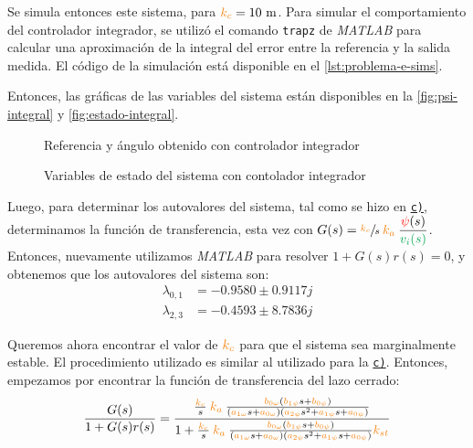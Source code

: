 Se simula entonces este sistema, para $\nara{k_{c}} = 10\ \unit{m}$. Para simular
el comportamiento del controlador integrador, se utilizó el comando \verb|trapz|
de \textit{MATLAB} para calcular una aproximación de la integral del error entre
la referencia y la salida medida. El código de la simulación está disponible en
el \autoref{lst:problema-e-sims}.

Entonces, las gráficas de las variables del sistema están disponibles en la
\autoref{fig:psi-integral} y \autoref{fig:estado-integral}.

\begin{figure}[h]
  \centering
  
  \caption{Referencia y ángulo obtenido con controlador integrador}\label{fig:psi-integral}
\end{figure}

\begin{figure}[h]
  \centering
  
  \caption{Variables de estado del sistema con contolador integrador}\label{fig:estado-integral}
\end{figure}

\FloatBarrier

Luego, para determinar los autovalores del sistema, tal como se hizo en 
\hyperref[pregunta-c]{\texttt{c)}}, determinamos la función de transferencia,
esta vez con $G(s) = \sfrac{\nara{k_{c}}}{s} \nara{k_{a}} \dfrac{\rojo{\psi}(s)}{\verd{v_{i}(s)}}$.
Entonces, nuevamente utilizamos \textit{MATLAB} para resolver $1 + G(s)r(s) = 0$,
y obtenemos que los autovalores del sistema son:
\begin{align*}
  \lambda_{0,1} &= -0.9580 \pm 0.9117j \\
  \lambda_{2,3} &= -0.4593 \pm 8.7836j
\end{align*}

\FloatBarrier

Queremos ahora encontrar el valor de $\nara{k_c}$ para que el sistema sea
marginalmente estable. El procedimiento utilizado es similar al utilizado para la
\hyperref[pregunta-c]{\texttt{c)}}. Entonces, empezamos por encontrar la función
de transferencia del lazo cerrado:
\begin{equation}
  \frac{G(s)}{1 + G(s)r(s)} = \dfrac{\frac{\nara{k_c}}{s}\nara{k_a} \frac{\nara{\nara{b_{0\omega}}}\left(\nara{b_{1\psi}}s + \nara{b_{0\psi}}\right)}
  {\left(\nara{a_{1\omega}}s + \nara{a_{0\omega}}\right)\left(\nara{a_{2\psi}}s^{2} + \nara{a_{1\psi}}s + \nara{a_{0\psi}}\right)}}
  {1+\frac{\nara{k_c}}{s} \nara{k_a} \frac{\nara{\nara{b_{0\omega}}}\left(\nara{b_{1\psi}}s + \nara{b_{0\psi}}\right)}
  {\left(\nara{a_{1\omega}}s + \nara{a_{0\omega}}\right)\left(\nara{a_{2\psi}}s^{2} + \nara{a_{1\psi}}s + \nara{a_{0\psi}}\right)}\nara{k_{st}}}
\end{equation}

